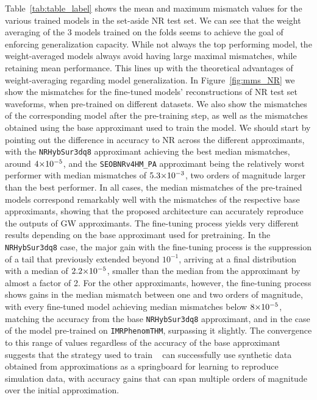 \documentclass[%
 reprint,
superscriptaddress,
nofootinbib,
 amsmath,amssymb,
 aps,
prd,
floatfix,
]{revtex4-2}
\newcommand{\change}[1]{#1}
\begin{document}
\change{Table~\ref{tab:table_label} shows the mean and maximum mismatch values for the various trained models in the set-aside NR test set. We can see that the weight averaging of the 3 models trained on the folds seems to achieve the goal of enforcing generalization capacity. While not always the top performing model, the weight-averaged models always avoid having large maximal mismatches, while retaining mean performance. This lines up with the theoretical advantages of weight-averaging regarding model generalization. In Figure~\ref{fig:mms_NR} we show the mismatches for the fine-tuned models' reconstructions of NR test set waveforms, when pre-trained on different datasets. We also show the mismatches of the corresponding model after the pre-training step, as well as the mismatches obtained using the base approximant used to train the model. We should start by pointing out the difference in accuracy to NR across the different approximants, with the \texttt{NRHybSur3dq8} approximant achieving the best median mismatches, around $4{\times}10^{-5}$, and the \texttt{SEOBNRv4HM\_PA} approximant being the relatively worst performer with median mismatches of $5.3{\times}10^{-3}$, two orders of magnitude larger than the best performer. In all cases, the median mismatches of the pre-trained models correspond remarkably well with the mismatches of the respective base approximants, showing that the proposed architecture can accurately reproduce the outputs of GW approximants. The fine-tuning process yields very different results depending on the base approximant used for pretraining. In the \texttt{NRHybSur3dq8} case, the major gain with the fine-tuning process is the suppression of a tail that previously extended beyond $10^{-1}$, arriving at a final distribution with a median of $2.2{\times}10^{-5}$, smaller than the median from the approximant by almost a factor of 2. For the other approximants, however, the fine-tuning process shows gains in the median mismatch between one and two orders of magnitude, with every fine-tuned model achieving median mismatches below $8{\times}10^{-5}$, matching the accuracy from the base \texttt{NRHybSur3dq8} approximant, and in the case of the model pre-trained on \texttt{IMRPhenomTHM}, surpassing it slightly. The convergence to this range of values regardless of the accuracy of the base approximant suggests that the strategy used to train \dansur~ can successfully use synthetic data obtained from approximations as a springboard for learning to reproduce simulation data, with accuracy gains that can span multiple orders of magnitude over the initial approximation.}
\end{document}
